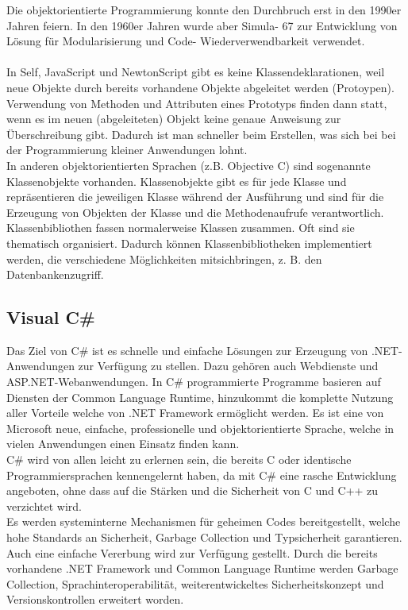 \documentclass[12pt,a4paper]{report}
\begin{document}
Die objektorientierte Programmierung konnte den Durchbruch erst in den 1990er Jahren feiern. In den 1960er Jahren wurde aber Simula- 67 zur Entwicklung von Lösung für Modularisierung und Code- Wiederverwendbarkeit verwendet.\\
\\In Self, JavaScript und NewtonScript gibt es keine Klassendeklarationen, weil neue Objekte durch bereits vorhandene Objekte abgeleitet werden (Protoypen). Verwendung von Methoden und Attributen eines Prototyps finden dann statt, wenn es im neuen (abgeleiteten) Objekt keine genaue Anweisung zur Überschreibung gibt. Dadurch ist man schneller beim Erstellen, was sich bei bei der Programmierung kleiner Anwendungen lohnt.\\

In anderen objektorientierten Sprachen (z.B. Objective C) sind sogenannte Klassenobjekte vorhanden. Klassenobjekte gibt es für jede Klasse und repräsentieren die jeweiligen Klasse während der Ausführung und sind für die Erzeugung von Objekten der Klasse und die Methodenaufrufe verantwortlich.\\

Klassenbibliothen fassen normalerweise Klassen zusammen. Oft sind sie thematisch organisiert. Dadurch können Klassenbibliotheken implementiert werden, die verschiedene Möglichkeiten mitsichbringen, z. B. den Datenbankenzugriff.

\subsection{Visual C\#}
Das Ziel von C\# ist es schnelle und einfache Lösungen zur Erzeugung von .NET-Anwendungen zur Verfügung zu stellen. Dazu gehören auch Webdienste und ASP.NET-Webanwendungen. In C\# programmierte Programme basieren auf Diensten der Common Language Runtime, hinzukommt die komplette Nutzung aller Vorteile welche von .NET Framework ermöglicht werden. Es ist eine von Microsoft neue, einfache, professionelle und objektorientierte Sprache, welche in vielen Anwendungen einen Einsatz finden kann.\\

C\# wird von allen leicht zu erlernen sein, die bereits C oder identische Programmiersprachen kennengelernt haben, da mit C\# eine rasche Entwicklung angeboten, ohne dass auf die Stärken und die Sicherheit von C und C++ zu verzichtet wird.\\

Es werden systeminterne Mechanismen für geheimen Codes bereitgestellt, welche hohe Standards an Sicherheit, Garbage Collection und Typsicherheit garantieren.
\\Auch eine einfache Vererbung wird zur Verfügung gestellt. Durch die bereits vorhandene .NET Framework und Common Language Runtime werden Garbage Collection, Sprachinteroperabilität, weiterentwickeltes Sicherheitskonzept und Versionskontrollen erweitert worden.\\
\end{document}
